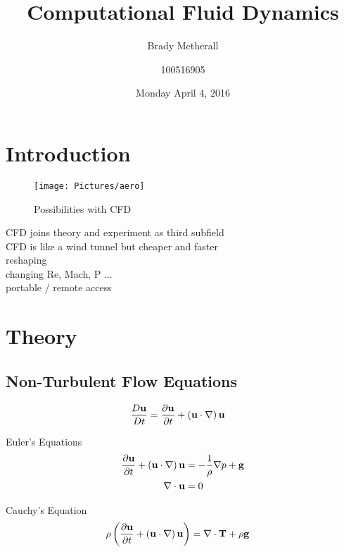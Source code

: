 \documentclass[10pt, titlepage]{article}
\title{Computational Fluid Dynamics}
\author{Brady Metherall \and 100516905}
\date{Monday April 4, 2016}
\begin{document}
\maketitle
\setlength\parindent{0pt}
\lstset{language=myMMA}

\listoffigures

\section{Introduction}

\begin{wrapfigure}{R}{0.5\textwidth}
\centering
\texttt{[image: Pictures/aero]}
\caption[Possibilities with CFD]{Possibilities with CFD \cite{aeroplane}}
\label{fig:aeroplane}
\end{wrapfigure}

CFD joins theory and experiment as third subfield \\
CFD is like a wind tunnel but cheaper and faster \\
reshaping \\
changing Re, Mach, P ... \\
portable / remote access \\

\lipsum[1-4]

\section{Theory}

\subsection{Non-Turbulent Flow Equations}
\begin{align*}
\frac{D\bf{u}}{Dt} &= \frac{\partial \bf{u}}{\partial t} + \left( \bf{u} \cdot \nabla \right) \bf{u}
\end{align*}

Euler's Equations
\begin{align}
\frac{\partial \bf{u}}{\partial t} + \left( \bf{u} \cdot \nabla \right) \bf{u} &= - \frac{1}{\rho} \nabla p + \bf{g} \label{eq:euler} \\
\nabla \cdot \bf{u} &= 0 \label{eq:incomp}
\end{align}

Cauchy's Equation
\begin{align}
\rho \left( \frac{\partial \bf{u}}{\partial t} + \left( \bf{u} \cdot \nabla \right) \bf{u} \right) &= \nabla \cdot \bf{T} + \rho \bf{g}
\end{align}
\end{document}
